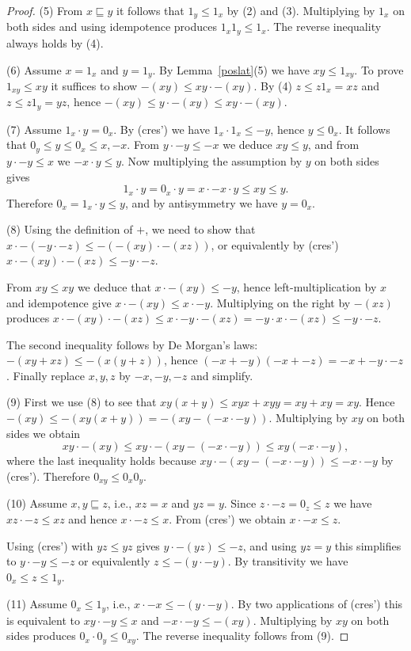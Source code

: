 \documentclass[12pt]{amsart}
\begin{document}
\begin{proof}
(5) From $x\sqsubseteq y$ it follows that $1_y\le 1_x$ by (2) and (3). Multiplying by $1_x$ on both sides and using idempotence produces $1_x1_y\le 1_x$. The reverse inequality always holds by (4).

(6) Assume $x=1_x$ and $y=1_y$. By Lemma~\ref{poslat}(5) we have $xy\le 1_{xy}$. To prove
$1_{xy}\le xy$ it suffices to show $-(xy)\le xy\cdot -(xy)$. By (4) $z\le z1_x=xz$ and $z\le z1_y=yz$,
hence $-(xy)\le y\cdot -(xy)\le xy\cdot -(xy)$.

(7) Assume $1_x\cdot y=0_x$. By (cres') we have $1_x\cdot 1_x\le -y$, hence $y\le 0_x$.
It follows that $0_y\le y\le 0_x\le x,-x$. From $y\cdot -y\le -x$ we deduce $xy\le y$, and from
$y\cdot -y\le x$ we $-x\cdot y\le y$. Now multiplying the assumption by $y$ on both sides
gives
$$
1_x\cdot y=0_x\cdot y=x\cdot -x\cdot y\le  xy\le y.
$$
Therefore $0_x=1_x\cdot y\le y$, and by antisymmetry we have $y=0_x$.

(8) Using the definition of $+$, we need to show that $x\cdot -(-y\cdot -z)\le -(-(xy)\cdot -(xz))$,
or equivalently by (cres') $x\cdot-(xy)\cdot-(xz)\le-y\cdot-z$.

From $xy\le xy$ we deduce that $x\cdot-(xy) \le -y$, hence left-multiplication by $x$
and idempotence give $x\cdot-(xy) \le x\cdot -y$. Multiplying on the right by $-(xz)$ produces
$x\cdot-(xy)\cdot -(xz)\le x\cdot -y\cdot -(xz)=-y\cdot x\cdot -(xz)\le -y\cdot -z$.

The second inequality follows by De Morgan's laws: $-(xy+xz)\le -(x(y+z))$, hence
$(-x+-y)(-x+-z)=-x+-y\cdot -z$. Finally replace $x,y,z$ by $-x,-y,-z$ and simplify.

(9) First we use (8) to see that $xy(x+y)\le xyx+xyy = xy+xy = xy$. Hence $-(xy)\le -(xy(x+y))=
-(xy-(-x\cdot -y))$. Multiplying by $xy$ on both sides we obtain
$$
xy\cdot -(xy)\le xy\cdot -(xy-(-x\cdot -y))\le xy(-x\cdot -y),
$$
where the last inequality holds because $xy\cdot-(xy-(-x\cdot -y))\le -x\cdot -y$ by (cres').
Therefore $0_{xy}\le 0_x0_y$.

(10) Assume $x,y\sqsubseteq z$, i.e., $xz=x$ and $yz=y$. Since $z\cdot -z=0_z\le z$ we have
$xz\cdot -z\le xz$ and hence $x\cdot -z\le x$. From (cres') we obtain $x\cdot -x\le z$.

Using (cres') with $yz\le yz$ gives $y\cdot -(yz)\le -z$, and using $yz=y$ this simplifies to $y\cdot -y\le -z$ or equivalently $z\le -(y\cdot -y)$. By transitivity we have $0_x\le z\le 1_y$.

(11) Assume $0_x\le 1_y$, i.e., $x\cdot -x\le -(y\cdot -y)$. By two applications of (cres') this is equivalent to $xy\cdot -y\le x$ and $-x\cdot -y\le -(xy)$. Multiplying by $xy$ on both sides produces $0_x\cdot 0_y\le 0_{xy}$. The reverse inequality follows from (9).
\end{proof}
\end{document}
